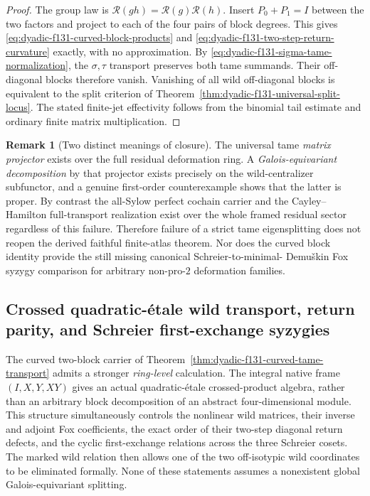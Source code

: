 \documentclass[11pt]{article}
\theoremstyle{definition}
\newtheorem{remark}[theorem]{Remark}
\begin{document}
\begin{proof}
The group law is
$\mathcal R(gh)
=\mathcal R(g)\mathcal R(h)$.
Insert $P_0+P_1=I$
between the two factors
and project to each of
the four pairs of block
degrees.  This gives
\eqref{eq:dyadic-f131-curved-block-products}
and
\eqref{eq:dyadic-f131-two-step-return-curvature}
exactly, with no
approximation.
By
\eqref{eq:dyadic-f131-sigma-tame-normalization},
the $\sigma,\tau$
transport preserves
both tame summands.
Their off-diagonal
blocks therefore vanish.
Vanishing of all wild
off-diagonal blocks is
equivalent to the split
criterion of
Theorem~\ref{thm:dyadic-f131-universal-split-locus}.
The stated finite-jet
effectivity follows
from the binomial
tail estimate and
ordinary finite
matrix multiplication.
\end{proof}

\begin{remark}[Two distinct meanings of closure]
\label{rem:dyadic-f131-split-versus-global-atlas}
The universal tame
\emph{matrix projector}
exists over the full
residual deformation
ring.  A
\emph{Galois-equivariant
decomposition} by that
projector exists
precisely on the
wild-centralizer
subfunctor, and a
genuine first-order
counterexample shows
that the latter is
proper.
By contrast the
all-Sylow perfect
cochain carrier and
the Cayley--Hamilton
full-transport
realization exist
over the whole
framed residual
sector regardless
of this failure.
Therefore failure of
a strict tame
eigensplitting does
not reopen the
derived faithful
finite-atlas theorem.
Nor does the curved
block identity
provide the still
missing canonical
Schreier-to-minimal-
Demu\v{s}kin Fox
syzygy comparison
for arbitrary
non-pro-$2$
deformation families.
\end{remark}


\subsection{Crossed quadratic-\'etale wild transport, return parity, and
Schreier first-exchange syzygies}
\label{subsec:dyadic-f132-crossed-schreier-exchange}

The curved two-block carrier of
Theorem~\ref{thm:dyadic-f131-curved-tame-transport}
admits a stronger \emph{ring-level} calculation.
The integral native frame $(I,X,Y,XY)$ gives an
actual quadratic-\'etale crossed-product algebra,
rather than an arbitrary block decomposition of
an abstract four-dimensional module.  This structure
simultaneously controls the nonlinear wild matrices,
their inverse and adjoint Fox coefficients, the exact
order of their two-step diagonal return defects,
and the cyclic first-exchange relations across the
three Schreier cosets.  The marked wild relation
then allows one of the two off-isotypic wild
coordinates to be eliminated formally.
None of these statements assumes a nonexistent
global Galois-equivariant splitting.
\end{document}
